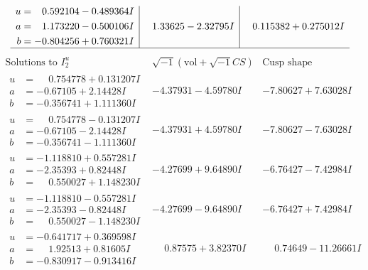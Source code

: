 \documentclass[1p]{elsarticle_modified}
\theoremstyle{definition}
\newcommand{\I}{\sqrt{-1}}
\begin{document}
$$\begin{array}{c|c|c}
\begin{aligned}
u &= \phantom{-}0.592104 - 0.489364 I \\
a &= \phantom{-}1.173220 - 0.500106 I \\
b &= -0.804256 + 0.760321 I\end{aligned}
 & \phantom{-}1.33625 - 2.32795 I & \phantom{-}0.115382 + 0.275012 I\\
 \hline 
 \end{array}$$\newpage$$\begin{array}{c|c|c}  
\text{Solutions to }I^u_{2}& \I (\text{vol} + \sqrt{-1}CS) & \text{Cusp shape}\\
 \hline 
\begin{aligned}
u &= \phantom{-}0.754778 + 0.131207 I \\
a &= -0.67105 + 2.14428 I \\
b &= -0.356741 + 1.111360 I\end{aligned}
 & -4.37931 - 4.59780 I & -7.80627 + 7.63028 I \\ \hline\begin{aligned}
u &= \phantom{-}0.754778 - 0.131207 I \\
a &= -0.67105 - 2.14428 I \\
b &= -0.356741 - 1.111360 I\end{aligned}
 & -4.37931 + 4.59780 I & -7.80627 - 7.63028 I \\ \hline\begin{aligned}
u &= -1.118810 + 0.557281 I \\
a &= -2.35393 + 0.82448 I \\
b &= \phantom{-}0.550027 + 1.148230 I\end{aligned}
 & -4.27699 + 9.64890 I & -6.76427 - 7.42984 I \\ \hline\begin{aligned}
u &= -1.118810 - 0.557281 I \\
a &= -2.35393 - 0.82448 I \\
b &= \phantom{-}0.550027 - 1.148230 I\end{aligned}
 & -4.27699 - 9.64890 I & -6.76427 + 7.42984 I \\ \hline\begin{aligned}
u &= -0.641717 + 0.369598 I \\
a &= \phantom{-}1.92513 + 0.81605 I \\
b &= -0.830917 - 0.913416 I\end{aligned}
 & \phantom{-}0.87575 + 3.82370 I & \phantom{-}0.74649 - 11.26661 I \\ \hline\begin{aligned}

\end{aligned}
\end{array}$$
\end{document}
